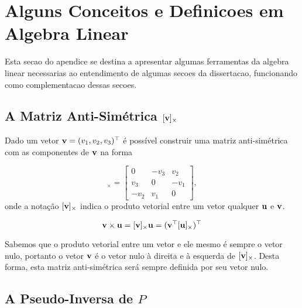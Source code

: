 \section{Alguns Conceitos e Definicoes em Algebra Linear}
Esta secao do apendice se destina a apresentar algumas ferramentas da algebra linear necessarias ao entendimento de algumas secoes da dissertacao, funcionando como complementacao dessas secoes.

\subsection{A Matriz Anti-Simétrica $[{\bf v}]_\times$}
Dado um vetor ${\bf v}=(v_1,v_2,v_3)^\top$ é possível construir uma matriz anti-simétrica com as componentes de ${\bf v}$ na forma

\begin{equation*}
[{\bf v}]_\times=
\begin{bmatrix}
0&-v_3&v_2\\
v_3&0&-v_1\\
-v_2&v_1&0
\end{bmatrix},
\end{equation*}
onde a notação $[{\bf v}]_\times$ indica o produto vetorial entre um vetor qualquer ${\bf u}$ e ${\bf v}$. 

\begin{equation*}
{\bf v} \times {\bf u} = [{\bf v}]_\times {\bf u} = ({\bf v}^\top [{\bf u}]_\times)^\top
\end{equation*}

Sabemos que o produto vetorial entre um vetor e ele mesmo é sempre o vetor nulo, portanto o vetor ${\bf v}$ é o vetor nulo à direita e à esquerda de $[{\bf v}]_\times$. Desta forma, esta matriz anti-simétrica será sempre definida por seu vetor nulo.  

\subsection{A Pseudo-Inversa de $P$}
